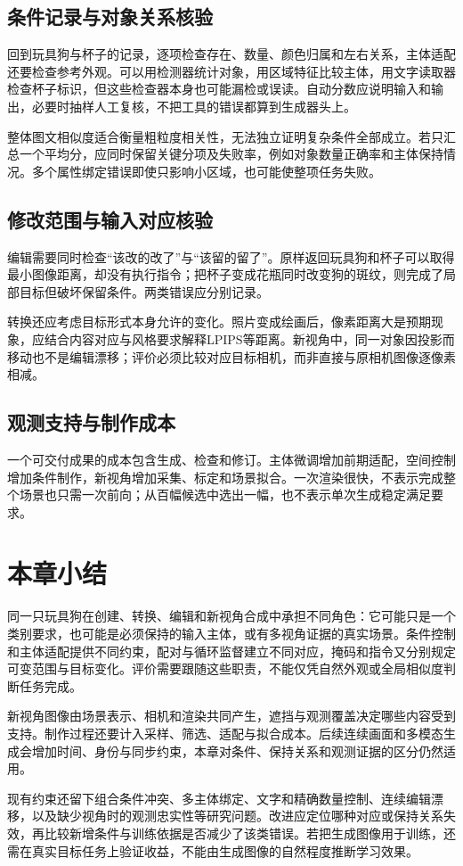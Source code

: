 \subsection{条件记录与对象关系核验}
\label{sec:vision-generation-condition-check}

回到玩具狗与杯子的记录，逐项检查存在、数量、颜色归属和左右关系，主体适配还要检查参考外观。可以用检测器统计对象，用区域特征比较主体，用文字读取器检查杯子标识，但这些检查器本身也可能漏检或误读。自动分数应说明输入和输出，必要时抽样人工复核，不把工具的错误都算到生成器头上。

整体图文相似度适合衡量粗粒度相关性，无法独立证明复杂条件全部成立。若只汇总一个平均分，应同时保留关键分项及失败率，例如对象数量正确率和主体保持情况。多个属性绑定错误即使只影响小区域，也可能使整项任务失败。

\subsection{修改范围与输入对应核验}
\label{sec:vision-generation-change-check}

编辑需要同时检查“该改的改了”与“该留的留了”。原样返回玩具狗和杯子可以取得最小图像距离，却没有执行指令；把杯子变成花瓶同时改变狗的斑纹，则完成了局部目标但破坏保留条件。两类错误应分别记录。

转换还应考虑目标形式本身允许的变化。照片变成绘画后，像素距离大是预期现象，应结合内容对应与风格要求解释LPIPS等距离。新视角中，同一对象因投影而移动也不是编辑漂移；评价必须比较对应目标相机，而非直接与原相机图像逐像素相减。

\subsection{观测支持与制作成本}
\label{sec:vision-generation-costs}

一个可交付成果的成本包含生成、检查和修订。主体微调增加前期适配，空间控制增加条件制作，新视角增加采集、标定和场景拟合。一次渲染很快，不表示完成整个场景也只需一次前向；从百幅候选中选出一幅，也不表示单次生成稳定满足要求。

\section{本章小结}
\label{sec:vision-generation-summary}

同一只玩具狗在创建、转换、编辑和新视角合成中承担不同角色：它可能只是一个类别要求，也可能是必须保持的输入主体，或有多视角证据的真实场景。条件控制和主体适配提供不同约束，配对与循环监督建立不同对应，掩码和指令又分别规定可变范围与目标变化。评价需要跟随这些职责，不能仅凭自然外观或全局相似度判断任务完成。

新视角图像由场景表示、相机和渲染共同产生，遮挡与观测覆盖决定哪些内容受到支持。制作过程还要计入采样、筛选、适配与拟合成本。后续连续画面和多模态生成会增加时间、身份与同步约束，本章对条件、保持关系和观测证据的区分仍然适用。

现有约束还留下组合条件冲突、多主体绑定、文字和精确数量控制、连续编辑漂移，以及缺少视角时的观测忠实性等研究问题。改进应定位哪种对应或保持关系失效，再比较新增条件与训练依据是否减少了该类错误。若把生成图像用于训练，还需在真实目标任务上验证收益，不能由生成图像的自然程度推断学习效果。
